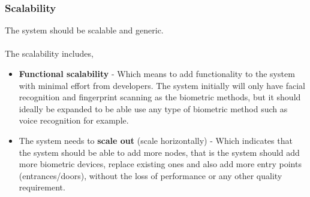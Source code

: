 \subsubsection{Scalability}
The system should be scalable and generic.\\
\\The scalability includes,
\begin{itemize}
	\item  \textbf{Functional scalability} - Which means to add functionality to the system with minimal effort from developers.
		The system initially will only have facial recognition and fingerprint scanning as the biometric methods, but it should ideally be expanded to be able use any type of biometric method such as voice recognition for example.
	\item  The system needs to \textbf{scale out} (scale horizontally) - Which indicates that the system should be able to add more nodes, that is the system should add more biometric devices, replace existing ones and also add more entry points (entrances/doors), without the loss of performance or any other quality requirement.
\end{itemize}





